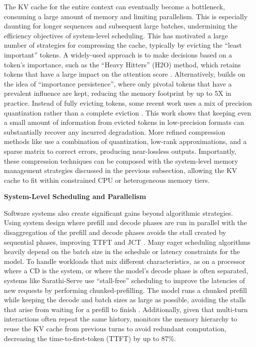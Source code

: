 \documentclass[11pt]{article}
\begin{document}
The KV cache for the entire context can eventually become a bottleneck, consuming a large amount of memory and limiting parallelism. This is especially daunting for longer sequences and subsequent large batches, undermining the efficiency objectives of system-level scheduling. This has motivated a large number of strategies for compressing the cache, typically by evicting the ``least important'' tokens. A widely-used approach is to make decisions based on a token's importance, such as the ``Heavy Hitters'' (H2O) method, which retains tokens that have a large impact on the attention score \cite{ref306}. Alternatively, \cite{ref305} builds on the idea of ``importance persistence'', where only pivotal tokens that have a prevalent influence are kept, reducing the memory footprint by up to 5X in practice. Instead of fully evicting tokens, some recent work uses a mix of precision quantization rather than a complete eviction \cite{ref172}. This work shows that keeping even a small amount of information from evicted tokens in low-precision formats can substantially recover any incurred degradation. More refined compression methods like \cite{ref171} use a combination of quantization, low-rank approximations, and a sparse matrix to correct errors, producing near-lossless outputs. Importantly, these compression techniques can be composed with the system-level memory management strategies discussed in the previous subsection, allowing the KV cache to fit within constrained CPU or heterogeneous memory tiers.

\textbf{System-Level Scheduling and Parallelism}

Software systems also create significant gains beyond algorithmic strategies. Using system design where prefill and decode phases are run in parallel with the disaggregation of the prefill and decode phases avoids the stall created by sequential phases, improving TTFT and JCT \cite{ref317}. Many eager scheduling algorithms heavily depend on the batch size in the schedule or latency constraints for the model. To handle workloads that mix different characteristics, as on a processor where a CD is the system, or where the model's decode phase is often separated, systems like Sarathi-Serve use ``stall-free'' scheduling to improve the latencies of new requests by performing chunked-prefilling. The model runs a chunked prefill while keeping the decode and batch sizes as large as possible, avoiding the stalls that arise from waiting for a prefill to finish \cite{ref334}. Additionally, given that multi-turn interactions often repeat the same history, \cite{ref335} monitors the memory hierarchy to reuse the KV cache from previous turns to avoid redundant computation, decreasing the time-to-first-token (TTFT) by up to 87\%.
\end{document}

